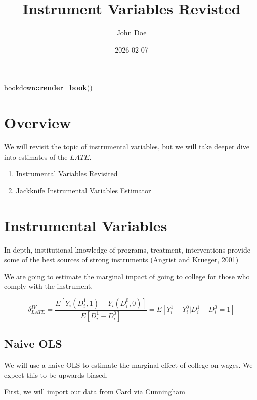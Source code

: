 \documentclass[
]{book}
\title{Instrument Variables Revisted}
\author{John Doe}
\date{2026-02-07}
\newenvironment{Shaded}{\begin{snugshade}}{\end{snugshade}}
\newcommand{\FunctionTok}[1]{\textcolor[rgb]{0.13,0.29,0.53}{\textbf{#1}}}
\newcommand{\NormalTok}[1]{#1}
\newcommand{\SpecialCharTok}[1]{\textcolor[rgb]{0.81,0.36,0.00}{\textbf{#1}}}
\providecommand{\tightlist}{%
  \setlength{\itemsep}{0pt}\setlength{\parskip}{0pt}}
\begin{document}
\maketitle

{
\setcounter{tocdepth}{1}
\tableofcontents
}
\begin{Shaded}
\begin{Highlighting}[]
\NormalTok{bookdown}\SpecialCharTok{::}\FunctionTok{render\_book}\NormalTok{()}
\end{Highlighting}
\end{Shaded}

\chapter*{Overview}\label{overview}

We will revisit the topic of instrumental variables, but we will take deeper dive into estimates of the \(LATE\).

\begin{enumerate}
\def\labelenumi{\arabic{enumi}.}
\tightlist
\item
  Instrumental Variables Revisited
\item
  Jackknife Instrumental Variables Estimator
\end{enumerate}

\chapter{Instrumental Variables}\label{instrumental-variables}

In-depth, institutional knowledge of programs, treatment, interventions provide some of the best sources of strong instruments (Angrist and Krueger, 2001)

We are going to estimate the marginal impact of going to college for those who comply with the instrument.

\[ \delta^{IV}_{LATE}=\frac{E[Y_i(D^1_i,1)-Y_i(D^0_i,0)]}{E[D^1_i-D^0_i]}=E[Y^1_i-Y^0_i|D^1_i-D^0_i=1]\]

\section{Naive OLS}\label{naive-ols}

We will use a naive OLS to estimate the marginal effect of college on wages. We expect this to be upwards biased.

First, we will import our data from Card via Cunningham
\end{document}
